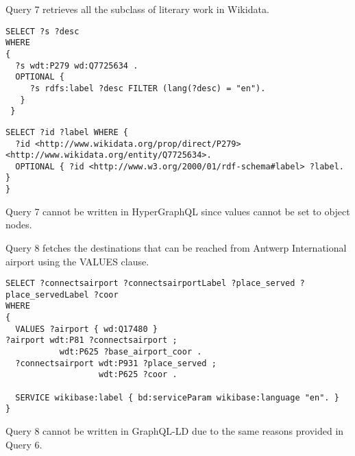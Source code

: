 Query 7 retrieves all the subclass of literary work in Wikidata.

\begin{minipage}{\linewidth}
\begin{lstlisting}[label=listing:listing47, caption={Query 7}]
SELECT ?s ?desc
WHERE
{
  ?s wdt:P279 wd:Q7725634 .
  OPTIONAL {
     ?s rdfs:label ?desc FILTER (lang(?desc) = "en").
   }
 }
\end{lstlisting}
\end{minipage}

\begin{minipage}{\linewidth}
\begin{lstlisting}[label=listing:listing48, caption={Query 7 - GraphQL-LD}]
SELECT ?id ?label WHERE {
  ?id <http://www.wikidata.org/prop/direct/P279> <http://www.wikidata.org/entity/Q7725634>.
  OPTIONAL { ?id <http://www.w3.org/2000/01/rdf-schema#label> ?label. }
}
\end{lstlisting}
\end{minipage}

Query 7 cannot be written in HyperGraphQL since values cannot be set to object nodes.

Query 8 fetches the destinations that can be reached from Antwerp International airport using the VALUES clause.

\begin{minipage}{\linewidth}
\begin{lstlisting}[label=listing:listing49, caption={Query 8}]
SELECT ?connectsairport ?connectsairportLabel ?place_served ?place_servedLabel ?coor
WHERE
{
  VALUES ?airport { wd:Q17480 }  
?airport wdt:P81 ?connectsairport ;
           wdt:P625 ?base_airport_coor .
  ?connectsairport wdt:P931 ?place_served ;
                   wdt:P625 ?coor .

  SERVICE wikibase:label { bd:serviceParam wikibase:language "en". }
}
\end{lstlisting}
\end{minipage}

Query 8 cannot be written in GraphQL-LD due to the same reasons provided in Query 6.

